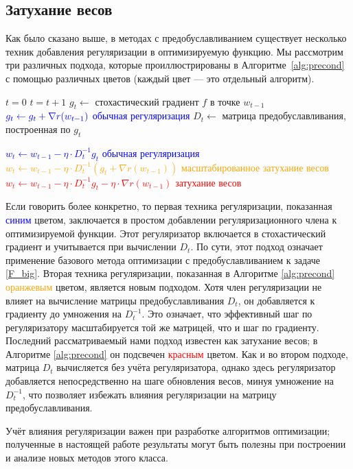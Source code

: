 \subsection{Затухание весов}
Как было сказано выше, в методах с предобуславливанием существует несколько техник добавления регуляризации в оптимизируемую функцию. Мы рассмотрим три различных подхода, которые проиллюстрированы в Алгоритме~\ref{alg:precond} с помощью различных цветов (каждый цвет --- это отдельный алгоритм).

\begin{algorithm}[H]
    \caption{Различные способы использования предобуславливания с регуляризацией}
    \label{alg:precond}

    \begin{algorithmic}
            \State $t = 0$
            \State $t = t+1$
            \State $g_t \gets$ стохастический градиент $f$ в точке $w_{t-1}$
            \State $\textcolor{blue}{g_t \gets g_t + \nabla r(w_{t-1})}$ \hfill \textcolor{blue}{обычная регуляризация}
            \State $D_t \gets$ матрица предобуславливания, построенная по $g_t$

            \State \textcolor{blue}{$w_t \gets w_{t-1} - \eta \cdot D_t^{-1}g_t $} \hfill \textcolor{blue}{обычная регуляризация}
            \State \textcolor{orange}{$w_t \gets w_{t-1} - \eta \cdot D_t^{-1} \left(g_t +\nabla r(w_{t-1}) \right)$} \hfill \textcolor{orange}{масштабированное затухание весов}
            \State \textcolor{red}{$w_t \gets w_{t-1} - \eta \cdot D_t^{-1} g_t  - \eta \cdot \nabla r(w_{t-1})$} \hfill \textcolor{red}{затухание весов}
            \EndWhile
    \end{algorithmic}
\end{algorithm}

Если говорить более конкретно, то первая техника регуляризации, показанная \textcolor{blue}{синим} цветом, заключается в простом добавлении регуляризационного члена к оптимизируемой функции. Этот регуляризатор включается в стохастический градиент и учитывается при вычислении $D_t$. По сути, этот подход означает применение базового метода оптимизации с предобуславливанием к задаче \eqref{F_big}.
Вторая техника регуляризации, показанная в Алгоритме \ref{alg:precond} \textcolor{orange}{оранжевым} цветом, является новым подходом. Хотя член регуляризации не влияет на вычисление матрицы предобуславливания $D_t$, он добавляется к градиенту до умножения на $D_t^{-1}$. Это означает, что эффективный шаг по регуляризатору масштабируется той же матрицей, что и шаг по градиенту.
Последний рассматриваемый нами подход известен как затухание весов; в Алгоритме \ref{alg:precond} он подсвечен \textcolor{red}{красным} цветом.
Как и во втором подходе, матрица $D_t$ вычисляется без учёта регуляризатора, однако здесь регуляризатор добавляется непосредственно на шаге обновления весов, минуя умножение на $D_t^{-1}$, что позволяет избежать влияния регуляризации на матрицу предобуславливания.

Учёт влияния регуляризации важен при разработке алгоритмов оптимизации; полученные в настоящей работе результаты могут быть полезны при построении и анализе новых методов этого класса.
